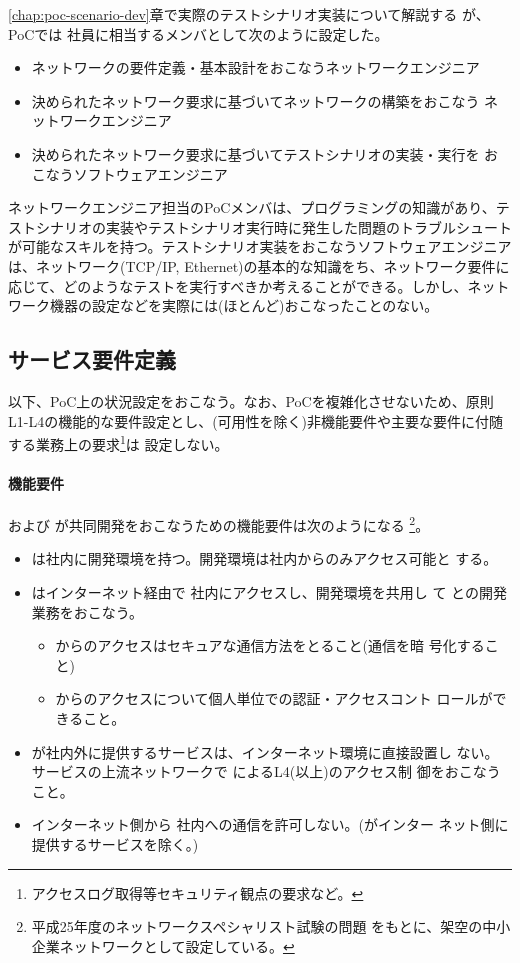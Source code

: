 \ref{chap:poc-scenario-dev}章で実際のテストシナリオ実装について解説する
が、PoCでは \tj 社員に相当するメンバとして次のように設定した。
\begin{itemize}
 \item ネットワークの要件定義・基本設計をおこなうネットワークエンジニア
 \item 決められたネットワーク要求に基づいてネットワークの構築をおこなう
       ネットワークエンジニア
 \item 決められたネットワーク要求に基づいてテストシナリオの実装・実行を
       おこなうソフトウェアエンジニア
\end{itemize}

ネットワークエンジニア担当のPoCメンバは、プログラミングの知識があり、テ
ストシナリオの実装やテストシナリオ実行時に発生した問題のトラブルシュート
が可能なスキルを持つ。テストシナリオ実装をおこなうソフトウェアエンジニア
は、ネットワーク(TCP/IP, Ethernet)の基本的な知識をち、ネットワーク要件に
応じて、どのようなテストを実行すべきか考えることができる。しかし、ネット
ワーク機器の設定などを実際には(ほとんど)おこなったことのない。

  \subsection{サービス要件定義}

以下、PoC上の状況設定をおこなう。なお、PoCを複雑化させないため、原則
L1-L4の機能的な要件設定とし、(可用性を除く)非機能要件や主要な要件に付随
する業務上の要求\footnote{アクセスログ取得等セキュリティ観点の要求など。}は
設定しない。

    \paragraph{機能要件}
\yo および \tj が共同開発をおこなうための機能要件は次のようになる
\footnote{平成25年度のネットワークスペシャリスト試験の問題\cite{h25nwsp}
をもとに、架空の中小企業ネットワークとして設定している。}。
\begin{itemize}
 \item \yo は社内に開発環境を持つ。開発環境は社内からのみアクセス可能と
       する。
 \item \tj はインターネット経由で \yo 社内にアクセスし、開発環境を共用し
       て \yo との開発業務をおこなう。
       \begin{itemize}
        \item \tj からのアクセスはセキュアな通信方法をとること(通信を暗
              号化すること)
        \item \tj からのアクセスについて個人単位での認証・アクセスコント
              ロールができること。
       \end{itemize}
 \item \yo が社内外に提供するサービスは、インターネット環境に直接設置し
       ない。サービスの上流ネットワークで \yo によるL4(以上)のアクセス制
       御をおこなうこと。
 \item インターネット側から \yo 社内への通信を許可しない。(\yo がインター
       ネット側に提供するサービスを除く。)
\end{itemize}

